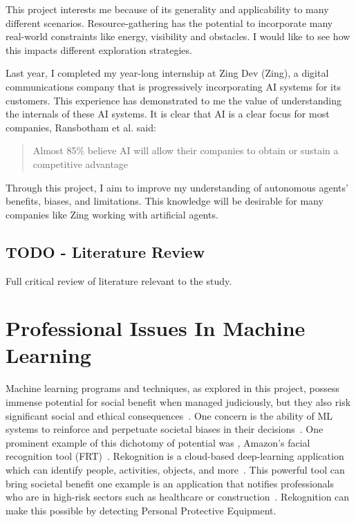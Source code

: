 \documentclass[]{final_report}
\begin{document}
This project interests me because of its generality and applicability to many different scenarios. Resource-gathering has the potential to incorporate many real-world constraints like energy, visibility and obstacles. I would like to see how this impacts different exploration strategies.

Last year, I completed my year-long internship at Zing Dev (Zing), a digital communications company that is progressively incorporating AI systems for its customers. This experience has demonstrated to me the value of understanding the internals of these AI systems. It is clear that AI is a clear focus for most companies, Ransbotham et al. said: 
\begin{quote}
  Almost 85\% believe AI will allow their companies to obtain or sustain a competitive advantage~\cite{ransbotham2017reshaping}
\end{quote}

Through this project, I aim to improve my understanding of autonomous agents' benefits, biases, and limitations. This knowledge will be desirable for many companies like Zing working with artificial agents.


\section{TODO - Literature Review}


Full critical review of literature relevant to the study.


\chapter{Professional Issues In Machine Learning}

Machine learning programs and techniques, as explored in this project, possess immense potential for social benefit when managed judiciously, but they also risk significant social and ethical consequences~\cite{AISocialImpactAndAccountability}. One concern is the ability of ML systems to reinforce and perpetuate societal biases in their decisions~\cite{AISocialImpactAndAccountability}. One prominent example of this dichotomy of potential was , Amazon's facial recognition tool (FRT)~\cite{legislatingOG}. Rekognition is a cloud-based deep-learning application which can identify people, activities, objects, and more~\cite{rekognitionOverview}. This powerful tool can bring societal benefit one example is an application that notifies professionals who are in high-risk sectors such as healthcare or construction~\cite{rekognitionOverview}. Rekognition can make this possible by detecting Personal Protective Equipment. 
\end{document}

